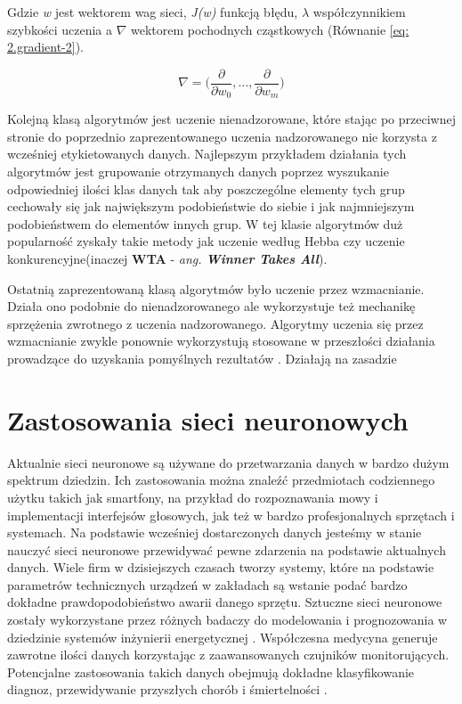 \documentclass[12pt, oneside, a4paper]{report}
\begin{document}
Gdzie \textit{w} jest wektorem wag sieci, \textit{J(w)} funkcją błędu, $\lambda$ współczynnikiem szybkości uczenia a $\nabla$ wektorem pochodnych cząstkowych (Równanie \ref{eq: 2.gradient-2}).

\begin{equation}\label{eq: 2.gradient-2}
	\nabla = \bigg( \frac{\partial}{\partial w_0}, \dots ,\frac{\partial}{\partial w_m} \bigg)
\end{equation}

Kolejną klasą algorytmów jest uczenie nienadzorowane, które stając po przeciwnej stronie do poprzednio zaprezentowanego uczenia nadzorowanego nie korzysta z wcześniej etykietowanych danych. Najlepszym przykładem działania tych algorytmów jest grupowanie otrzymanych danych poprzez wyszukanie odpowiedniej ilości klas danych tak aby poszczególne elementy tych grup cechowały się jak największym podobieństwie do siebie i jak najmniejszym podobieństwem do elementów innych grup. W tej klasie algorytmów duż popularność zyskały takie metody jak uczenie według Hebba czy uczenie konkurencyjne(inaczej \textbf{WTA} - \textit{ang. \textbf{Winner Takes All}}).

Ostatnią zaprezentowaną klasą algorytmów było uczenie przez wzmacnianie. Działa ono podobnie do nienadzorowanego ale wykorzystuje też mechanikę sprzężenia zwrotnego z uczenia nadzorowanego. Algorytmy uczenia się przez wzmacnianie zwykle ponownie wykorzystują stosowane w przeszłości działania prowadzące do uzyskania pomyślnych rezultatów \citep{roelants2017deeplearning}. Działają na zasadzie 

\section{Zastosowania sieci neuronowych}

Aktualnie sieci neuronowe są używane do przetwarzania danych w bardzo dużym spektrum dziedzin. Ich zastosowania można znaleźć przedmiotach codziennego użytku takich jak smartfony, na przykład do rozpoznawania mowy i implementacji interfejsów głosowych, jak też w bardzo profesjonalnych sprzętach i systemach. Na podstawie wcześniej dostarczonych danych jesteśmy w stanie nauczyć sieci neuronowe przewidywać pewne zdarzenia na podstawie aktualnych danych. Wiele firm w dzisiejszych czasach tworzy systemy, które na podstawie parametrów technicznych urządzeń w zakładach są wstanie podać bardzo dokładne prawdopodobieństwo awarii danego sprzętu. Sztuczne sieci neuronowe zostały wykorzystane przez różnych badaczy do modelowania i prognozowania w dziedzinie systemów inżynierii energetycznej \citep{kalogirou2000applications}. Współczesna medycyna generuje zawrotne ilości danych korzystając z zaawansowanych czujników monitorujących. Potencjalne zastosowania takich danych obejmują dokładne klasyfikowanie diagnoz, przewidywanie przyszłych chorób i śmiertelności \citep{lipton2015learning}.
\end{document}
